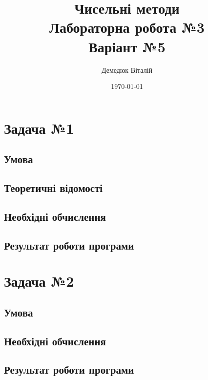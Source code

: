 \documentclass[a4paper, 12pt]{article}
\author{Демедюк Віталій}
\title{Чисельні методи\\
	   Лабораторна робота №3\\
	   Варіант №5}
\date{\today}
\begin{document}
\maketitle

\newpage
\tableofcontents

\newpage
\section{Задача №1}

\subsection{Умова}

\subsection{Теоретичні відомості}

\subsection{Необхідні обчислення}

\subsection{Результат роботи програми}


\newpage
\section{Задача №2}

\subsection{Умова}

\subsection{Необхідні обчислення}

\subsection{Результат роботи програми}
\end{document}
